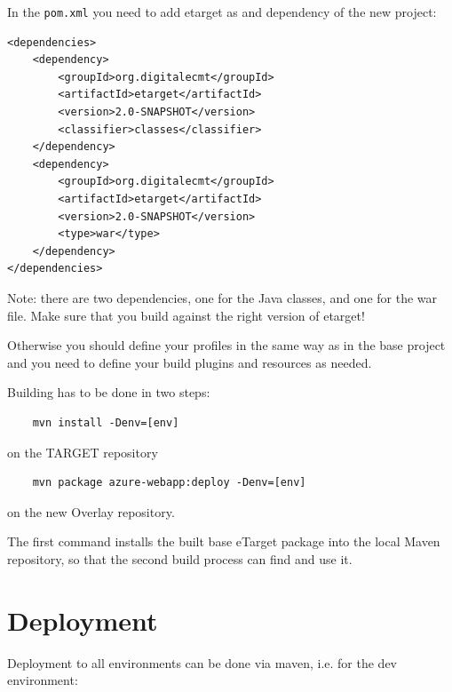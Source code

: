 \documentclass[10pt,a4paper,oneside]{article}
\begin{document}
	In the \verb|pom.xml| you need to add etarget as and dependency of the new project:
	\begin{lstlisting}
<dependencies>
	<dependency>
		<groupId>org.digitalecmt</groupId>
		<artifactId>etarget</artifactId>
		<version>2.0-SNAPSHOT</version>
		<classifier>classes</classifier>
	</dependency>
	<dependency>
		<groupId>org.digitalecmt</groupId>
		<artifactId>etarget</artifactId>
		<version>2.0-SNAPSHOT</version>
		<type>war</type>
	</dependency>
</dependencies>
	\end{lstlisting}
	Note: there are two dependencies, one for the Java classes, and one for the war file. Make sure that you build against the right version of etarget!
	
	Otherwise you should define your profiles in the same way as in the base project and you need to define your build plugins and resources as 
	needed.
	
	Building has to be done in two steps:
	\begin{lstlisting}
	mvn install -Denv=[env] 
	\end{lstlisting}
	on the TARGET repository
	\begin{lstlisting}
	mvn package azure-webapp:deploy -Denv=[env]
	\end{lstlisting}
	on the new Overlay repository.
	
	The first command installs the built base eTarget package into the local Maven repository, so that the second build process can find and use
	it.

\section{Deployment}
\label{sec:deploy}

	Deployment to all environments can be done via maven, i.e. for the dev environment:
	
\end{document}
